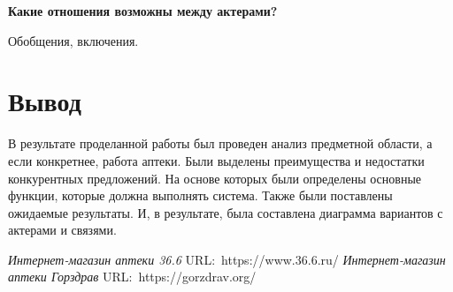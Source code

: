 \textbf{Какие отношения возможны между актерами?}\par
Обобщения, включения.

\newpage

\section*{Вывод}
В результате проделанной работы был проведен анализ предметной области,
а если конкретнее, работа аптеки.
Были выделены преимущества и недостатки конкурентных предложений.
На основе которых были определены основные функции, которые должна выполнять
система. Также были поставлены ожидаемые результаты.
И, в результате, была составлена диаграмма вариантов с актерами и связями.

\newpage

\begin{thebibliography}{0}
	 \textit{Интернет-магазин аптеки 36.6}
		URL:~https://www.36.6.ru/
	 \textit{Интернет-магазин аптеки Горздрав}
		URL:~https://gorzdrav.org/
\end{thebibliography}

